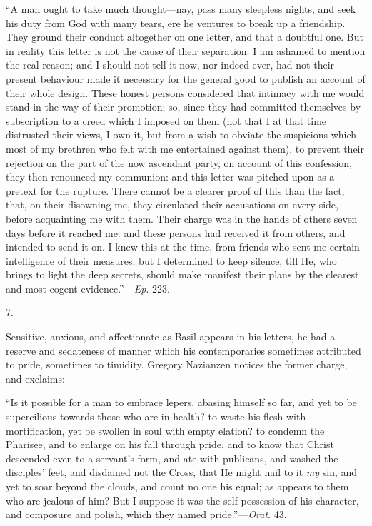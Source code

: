 ``A man ought to take much thought—nay, pass many sleepless
nights, and seek his duty from God with many tears, ere he ventures to
break up a friendship. They ground their conduct altogether on one
letter, and that a doubtful one. But in reality this letter is not the
cause of their separation. I am ashamed to mention the real reason;
and I should not tell it now, nor indeed ever, had not their present
behaviour made it necessary for the general good to publish an account
of their whole design. These honest persons considered that intimacy
with me would stand in the way of their promotion; so, since they had
committed themselves by subscription to a creed which I imposed on
them (not that I at that time distrusted their views, I own it, but
from a wish to obviate the suspicions which most of my brethren who
felt with me entertained against them), to prevent their rejection on
the part of the now ascendant party, on account of this confession,
they then renounced my communion: and this letter was pitched upon as
a pretext for the rupture. There cannot be a clearer proof of this
than the fact, that, on their disowning me, they circulated their
accusations on every side, before acquainting me with them. Their
charge was in the hands of others seven days before it reached me: and
these persons had received it from others, and intended to send it on.
I knew this at the time, from friends who sent me certain intelligence
of their measures; but I determined to keep silence, till He, who
brings to light the deep secrets, should make manifest their plans by
the clearest and most cogent evidence.''—\emph{Ep}. 223.

7.

Sensitive, anxious, and affectionate as Basil appears in his
letters, he had a reserve and sedateness of manner which his
contemporaries sometimes attributed to pride, sometimes to timidity.
Gregory Nazianzen notices the former charge, and exclaims:—

``Is it possible for a man to embrace lepers, abasing himself
so far, and yet to be supercilious towards those who are in health? to
waste his flesh with mortification, yet be swollen in soul with empty
elation? to condemn the Pharisee, and to enlarge on his fall through
pride, and to know that Christ descended even to a servant's form, and
ate with publicans, and washed the disciples' feet, and disdained not
the Cross, that He might nail to it \emph{my} sin, and yet to soar
beyond the clouds, and count no one his equal; as appears to them who
are jealous of him? But I suppose it was the self-possession of his
character, and composure and polish, which they named pride.''—\emph{Orat}.
43.

